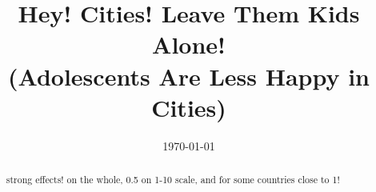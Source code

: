 \documentclass[10pt, letterpaper]{article}
\date{{}\today \hspace{.2in}\xxivtime}
\title{  %
  Hey! Cities! Leave Them Kids Alone! \\ \Large{(Adolescents Are Less Happy in Cities)} %
}
\author{
}
\begin{document}


\maketitle
\vspace{-.4in}
\begin{center}

\end{center}


\begin{abstract}
\noindent strong effects! on the whole, 0.5 on 1-10 scale, and for some countries close to 1!
\end{abstract}
\vspace{.15in} 
\noindent{\sc %
} 
\vspace{.25in} 
\end{document}
